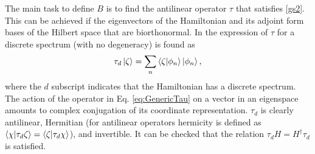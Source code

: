The main task  to define  $B$ is to find the antilinear operator $\tau$ that satisfies \eqref{gs2}.
This can be achieved if the eigenvectors of the Hamiltonian and its adjoint form bases of the Hilbert space that are biorthonormal.
In \cite{Mostafazadeh2002b} the expression of $\tau$ for a discrete spectrum (with no degeneracy) is found as
%
\begin{equation}
    \tau_d \ket{\zeta} = \sum_n \braket{\zeta}{\phi_n} \ket{\phi_n},
    \label{eq:GenericTau}
\end{equation}
%
where the $d$ subscript indicates that the Hamiltonian has a discrete spectrum. The action of the operator in Eq. \eqref{eq:GenericTau} on a vector in an eigenspace amounts to complex conjugation of its coordinate
representation. $\tau_d$ is clearly antilinear, Hermitian (for antilinear operators hermicity is defined as $\braket{\chi}{\tau_d \zeta} = \braket{\zeta}{\tau_d \chi}$), and invertible. It can be checked that the relation $\tau_d H = H^\dagger \tau_d$ is satisfied.


